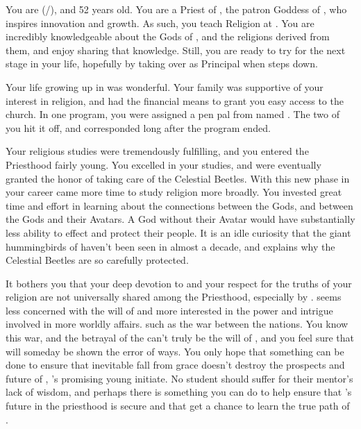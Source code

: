 \documentclass[char]{GL2020}
\begin{document}
\name{\cBeetle{}}

You are \cBeetle{} (\cBeetle{\they}/\cBeetle{\them}), and 52 years old. You are a Priest of \cTechGod{}, the patron Goddess of \pTech{}, who inspires innovation and growth.  As such, you teach Religion at \pSchool{}. You are incredibly knowledgeable about the Gods of \pEarth{}, and the religions derived from them, and enjoy sharing that knowledge. Still, you are ready to try for the next stage in your life, hopefully by taking over as Principal when \cPrincipal{} steps down.

Your life growing up in \pTech{} was wonderful. Your family was supportive of your interest in religion, and had the financial means to grant you easy access to the church. In one program, you were assigned a pen pal from \pFarm{} named \cMusic{}. The two of you hit it off, and corresponded long after the program ended.

Your religious studies were tremendously fulfilling, and you entered the Priesthood fairly young. You excelled in your studies, and were eventually granted the honor of taking care of the Celestial Beetles. With this new phase in your career came more time to study religion more broadly. You invested great time and effort in learning about the connections between the Gods, and between the Gods and their Avatars. A God without their Avatar would have substantially less ability to effect \pEarth{} and protect their people. It is an idle curiosity that the giant hummingbirds of \cFarmGod{} haven’t been seen in almost a decade, and explains why the Celestial Beetles are so carefully protected.

It bothers you that your deep devotion to \cTechGod{} and your respect for the truths of your religion are not universally shared among the Priesthood, especially by \cAntiChup{}. \cAntiChup{} seems less concerned with the will of \cTechGod{} and more interested in the power and intrigue involved in more worldly affairs. such as the war between the nations.  You know this war, and the betrayal of the \pShippies{} can’t truly be the will of \cTechGod{}, and you feel sure that \cAntiChup{} will someday be shown the error of \cAntiChup{\their} ways. You only hope that something can be done to ensure that \cAntiChup{\their} inevitable fall from grace doesn’t destroy the prospects and future of \cScholarship{}, \cAntiChup{}’s promising young initiate. No student should suffer for their mentor’s lack of wisdom, and perhaps there is something you can do to help ensure that \cScholarship{}’s future in the priesthood is secure and that \cScholarship{\they} get a chance to learn the true path of \cTechGod{}.
\end{document}

